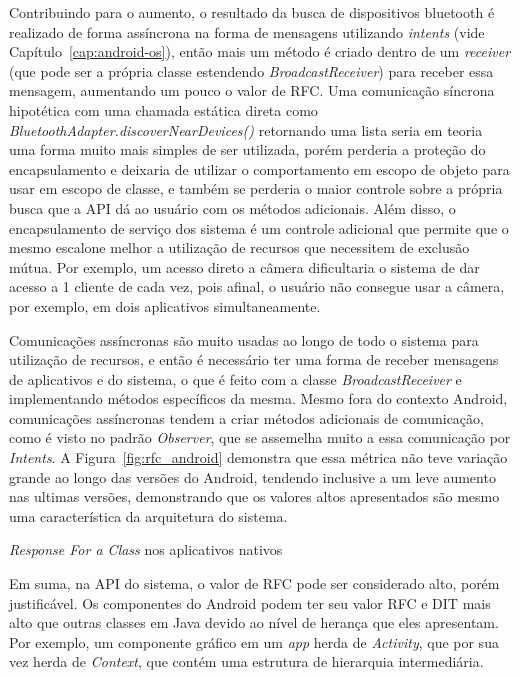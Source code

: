 Contribuindo para o aumento, o resultado da busca de dispositivos bluetooth é realizado de forma assíncrona na forma de mensagens utilizando \textit{intents} (vide Capítulo~\ref{cap:android-os}), então mais um método é criado dentro de um \textit{receiver} (que pode ser a própria classe estendendo \textit{BroadcastReceiver}) para receber essa mensagem, aumentando um pouco o valor de RFC. Uma comunicação síncrona hipotética com uma chamada estática direta como \textit{BluetoothAdapter.discoverNearDevices()} retornando uma lista seria em teoria uma forma muito mais simples de ser utilizada, porém perderia a proteção do encapsulamento e deixaria de utilizar o comportamento em escopo de objeto para usar em escopo de classe, e também se perderia o maior controle sobre a própria busca que a API dá ao usuário com os métodos adicionais. Além disso, o encapsulamento de serviço dos sistema é um controle adicional que permite que o mesmo escalone melhor a utilização de recursos que necessitem de exclusão mútua. Por exemplo, um acesso direto a câmera dificultaria o sistema de dar acesso a 1 cliente de cada vez, pois afinal, o usuário não consegue usar a câmera, por exemplo, em dois aplicativos simultaneamente.

Comunicações assíncronas são muito usadas ao longo de todo o sistema para utilização de recursos, e então é necessário ter uma forma de receber mensagens de aplicativos e do sistema, o que é feito com a classe \textit{BroadcastReceiver} e implementando métodos específicos da mesma. Mesmo fora do contexto Android, comunicações assíncronas tendem a criar métodos adicionais de comunicação, como é visto no padrão \textit{Observer}, que se assemelha muito a essa comunicação por \textit{Intents}. A Figura~\ref{fig:rfc_android} demonstra que essa métrica não teve variação grande ao longo das versões do Android, tendendo inclusive a um leve aumento nas ultimas versões, demonstrando que os valores altos apresentados são mesmo uma característica da arquitetura do sistema. 

\begin{table}[!htb]
\centering
{}

\caption{\textit{Response For a Class} nos aplicativos nativos}
\label{tab:rfc_apps}
\end{table}


Em suma, na API do sistema, o valor de RFC pode ser considerado alto, porém justificável. Os componentes do Android podem ter seu valor RFC e DIT mais alto que outras classes em Java devido ao nível de herança que eles apresentam. Por exemplo, um componente gráfico em um \textit{app} herda de \textit{Activity}, que por sua vez herda de \textit{Context}, que contém uma estrutura de hierarquia intermediária.


